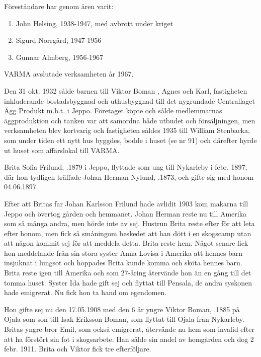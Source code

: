 Föreståndare har genom åren varit:

\begin{enumerate}
  \item John Helsing, 1938-1947, med avbrott under kriget
  \item Sigurd Norrgård, 1947-1956
  \item Gunnar Almberg, 1956-1967
\end{enumerate}

VARMA avslutade verksamheten år 1967.



Den 31 okt. 1932 sålde barnen till Viktor Boman , Agnes och Karl, fastigheten inkluderande bostadsbyggnad och uthusbyggnad till det nygrundade Centrallaget Ägg Produkt m.b.t. i Jeppo. Företaget köpte och sålde medlemmarnas äggproduktion och tanken var att samordna både utbudet och försäljningen, men verksamheten blev kortvarig och fastigheten såldes 1935 till William Stenbacka, som under tiden ett nytt hus byggdes, bodde i huset (se nr 91) och därefter hyrde ut huset som affärslokal till VARMA.



Brita Sofia Frilund, .1879 i Jeppo, flyttade som ung  till Nykarleby i febr. 1897, där hon tydligen träffade Johan Herman Nylund, .1873, och gifte sig med honom 04.06.1897.

Efter att Britas far Johan Karlsson Frilund hade avlidit 1903 kom makarna till Jeppo och övertog gården och hemmanet. Johan Herman reste nu till Amerika som så många andra, men hörde inte av sej. Hustrun Brita reste efter för att leta efter honom, men fick så  småningom beskedet att han dött i en skogscamp utan att någon kommit sej för att meddela detta. Brita reste hem. Något senare fick hon meddelande från sin stora syster Anna Lovisa i Amerika att hennes barn insjuknat i lungsot och hoppades Brita kunde komma och sköta hennes barn. Brita reste igen till Amerika och som 27-åring återvände hon än en gång till det tomma huset. Syster Ida hade gift sej och flyttat till Pensala, de andra syskonen hade emigrerat. Nu fick hon ta hand om egendomen.



Hon gifte sej nu den 17.05.1908 med den 6 år yngre Viktor Boman, .1885 på Ojala som son till Isak Eriksson Boman, som flyttat till Ojala från Nykarleby. Britas yngre bror Emil, som också emigrerat, återvände nu hem som invalid efter att ha förstört sin fot i skogsarbete. Han sålde sin andel av hemgården och dog 2 febr. 1911. Brita och Viktor fick tre efterföljare.

